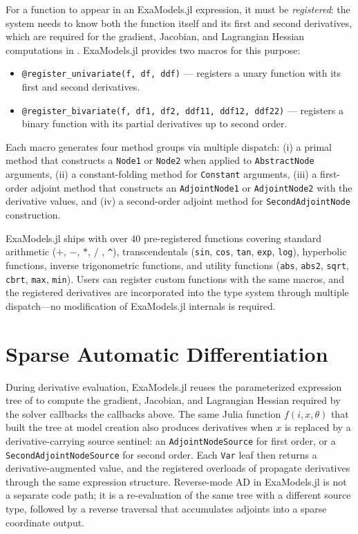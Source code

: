 \documentclass[11pt]{article}
\begin{document}
For a function to appear in an ExaModels.jl expression, it must be \emph{registered}: the system needs to know both the function itself and its first and second derivatives, which are required for the gradient, Jacobian, and Lagrangian Hessian computations in . ExaModels.jl provides two macros for this purpose:
\begin{itemize}
  \item \texttt{@register\_univariate(f, df, ddf)} --- registers a unary function with its first and second derivatives.
  \item \texttt{@register\_bivariate(f, df1, df2, ddf11, ddf12, ddf22)} --- registers a binary function with its partial derivatives up to second order.
\end{itemize}
Each macro generates four method groups via multiple dispatch: (i) a primal method that constructs a \texttt{Node1} or \texttt{Node2} when applied to \texttt{AbstractNode} arguments, (ii) a constant-folding method for \texttt{Constant} arguments, (iii) a first-order adjoint method that constructs an \texttt{AdjointNode1} or \texttt{AdjointNode2} with the derivative values, and (iv) a second-order adjoint method for \texttt{SecondAdjointNode} construction.

ExaModels.jl ships with over 40 pre-registered functions covering standard arithmetic ($+$, $-$, $*$, $/$ , \texttt{\^{}}), transcendentals (\texttt{sin}, \texttt{cos}, \texttt{tan}, \texttt{exp}, \texttt{log}), hyperbolic functions, inverse trigonometric functions, and utility functions (\texttt{abs}, \texttt{abs2}, \texttt{sqrt}, \texttt{cbrt}, \texttt{max}, \texttt{min}). Users can register custom functions with the same macros, and the registered derivatives are incorporated into the type system through multiple dispatch---no modification of ExaModels.jl internals is required.

\section{Sparse Automatic Differentiation}
\label{sec:ad}

During derivative evaluation, ExaModels.jl reuses the parameterized expression tree of  to compute the gradient, Jacobian, and Lagrangian Hessian required by the solver callbacks the callbacks above. The same Julia function $f(i, x, \theta)$ that built the tree at model creation also produces derivatives when $x$ is replaced by a derivative-carrying source sentinel: an \texttt{AdjointNodeSource} for first order, or a \texttt{SecondAdjointNodeSource} for second order. Each \texttt{Var} leaf then returns a derivative-augmented value, and the registered overloads of  propagate derivatives through the same expression structure. Reverse-mode AD in ExaModels.jl is not a separate code path; it is a re-evaluation of the same tree with a different source type, followed by a reverse traversal that accumulates adjoints into a sparse coordinate output.
\end{document}
